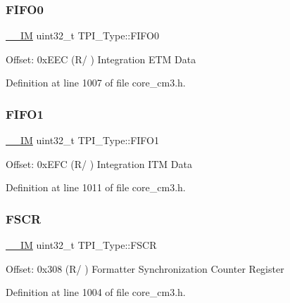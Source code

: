 \subsubsection{\texorpdfstring{F\+I\+F\+O0}{FIFO0}}
{\footnotesize\ttfamily \hyperlink{core__sc300_8h_a4cc1649793116d7c2d8afce7a4ffce43}{\+\_\+\+\_\+\+IM} uint32\+\_\+t T\+P\+I\+\_\+\+Type\+::\+F\+I\+F\+O0}

Offset\+: 0x\+E\+EC (R/ ) Integration E\+TM Data 

Definition at line 1007 of file core\+\_\+cm3.\+h.

\mbox{\label{struct_t_p_i___type_a061372fcd72f1eea871e2d9c1be849bc}} 
\subsubsection{\texorpdfstring{F\+I\+F\+O1}{FIFO1}}
{\footnotesize\ttfamily \hyperlink{core__sc300_8h_a4cc1649793116d7c2d8afce7a4ffce43}{\+\_\+\+\_\+\+IM} uint32\+\_\+t T\+P\+I\+\_\+\+Type\+::\+F\+I\+F\+O1}

Offset\+: 0x\+E\+FC (R/ ) Integration I\+TM Data 

Definition at line 1011 of file core\+\_\+cm3.\+h.

\mbox{\label{struct_t_p_i___type_ad6901bfd8a0089ca7e8a20475cf494a8}} 
\subsubsection{\texorpdfstring{F\+S\+CR}{FSCR}}
{\footnotesize\ttfamily \hyperlink{core__sc300_8h_a4cc1649793116d7c2d8afce7a4ffce43}{\+\_\+\+\_\+\+IM} uint32\+\_\+t T\+P\+I\+\_\+\+Type\+::\+F\+S\+CR}

Offset\+: 0x308 (R/ ) Formatter Synchronization Counter Register 

Definition at line 1004 of file core\+\_\+cm3.\+h.

\mbox{\label{struct_t_p_i___type_aaa573b2e073e76e93c51ecec79c616d0}} 
